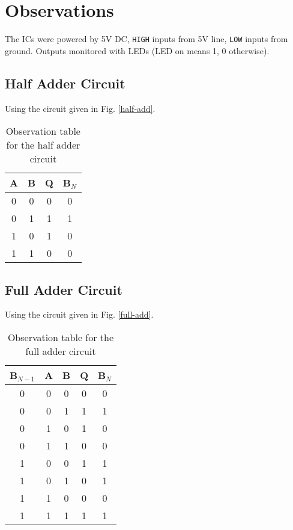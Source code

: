 \section{Observations}

The ICs were powered by 5V DC, \verb|HIGH| inputs from 5V line, \verb|LOW| inputs from ground. Outputs monitored with LEDs (LED on means 1, 0 otherwise).

\subsection{Half Adder Circuit}

\noindent Using the circuit given in Fig. \ref{half-add}.
\begin{table}[H]
    \centering
    \begin{tabular}{|c|c|c|c|}\hline
    A & B & Q & B$_N$ \\ \hline
    0 & 0 & 0 & 0 \\ 
    0 & 1 & 1 & 1 \\ 
    1 & 0 & 1 & 0 \\ 
    1 & 1 & 0 & 0 \\ \hline
    \end{tabular}
    \caption{Observation table for the half adder circuit}
\end{table}

\subsection{Full Adder Circuit}

\noindent Using the circuit given in Fig. \ref{full-add}.
\begin{table}[H]
    \centering
    \begin{tabular}{|c|c|c|c|c|}\hline
        B$_{N-1}$ & A & B & Q & B$_N$ \\ \hline
        0 & 0 & 0 & 0 & 0 \\ 
        0 & 0 & 1 & 1 & 1 \\ 
        0 & 1 & 0 & 1 & 0 \\ 
        0 & 1 & 1 & 0 & 0 \\
        1 & 0 & 0 & 1 & 1 \\ 
        1 & 0 & 1 & 0 & 1 \\ 
        1 & 1 & 0 & 0 & 0 \\ 
        1 & 1 & 1 & 1 & 1 \\ \hline
    \end{tabular}
    \caption{Observation table for the full adder circuit}
\end{table}


